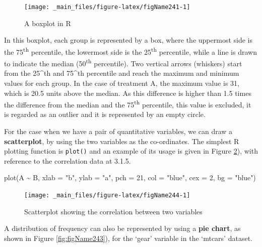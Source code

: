 \documentclass[a4paper,12pt,oneside]{book}
\newenvironment{Shaded}{\begin{snugshade}}{\end{snugshade}}
\newcommand{\DecValTok}[1]{#1}
\newcommand{\SpecialCharTok}[1]{#1}
\newcommand{\StringTok}[1]{#1}
\newcommand{\FunctionTok}[1]{#1}
\newcommand{\AttributeTok}[1]{#1}
\newcommand{\NormalTok}[1]{#1}
\begin{document}
\begin{figure}

{\centering \texttt{[image: \_main\_files/figure-latex/figName241-1]} 

}

\caption{A boxplot in R}\label{fig:figName241}
\end{figure}

In this boxplot, each group is represented by a box, where the uppermost side is the 75\textsuperscript{th} percentile, the lowermost side is the 25\textsuperscript{th} percentile, while a line is drawn to indicate the median (50\textsuperscript{th} percentile). Two vertical arrows (whiskers) start from the 25\^{}th and 75\^{}th percentile and reach the maximum and minimum values for each group. In the case of treatment A, the maximum value is 31, which is 20.5 units above the median. As this difference is higher than 1.5 times the difference from the median and the 75\textsuperscript{th} percentile, this value is excluded, it is regarded as an outlier and it is represented by an empty circle.

For the case when we have a pair of quantitative variables, we can draw a \textbf{scatterplot}, by using the two variables as the co-ordinates. The simplest R plotting function is \texttt{plot()} and an example of its usage is given in Figure \ref{fig:figName244}), with reference to the correlation data at 3.1.5.

\begin{Shaded}
\begin{Highlighting}[]
\FunctionTok{plot}\NormalTok{(A }\SpecialCharTok{\textasciitilde{}}\NormalTok{ B, }\AttributeTok{xlab =} \StringTok{"b"}\NormalTok{, }\AttributeTok{ylab =} \StringTok{"a"}\NormalTok{,}
     \AttributeTok{pch =} \DecValTok{21}\NormalTok{, }\AttributeTok{col =} \StringTok{"blue"}\NormalTok{, }\AttributeTok{cex =} \DecValTok{2}\NormalTok{, }\AttributeTok{bg =} \StringTok{"blue"}\NormalTok{)}
\end{Highlighting}
\end{Shaded}

\begin{figure}

{\centering \texttt{[image: \_main\_files/figure-latex/figName244-1]} 

}

\caption{Scatterplot showing the correlation between two variables}\label{fig:figName244}
\end{figure}

A distribution of frequency can also be represented by using a \textbf{pie chart}, as shown in Figure \ref{fig:figName243}), for the `gear' variable in the `mtcars' dataset.
\end{document}
